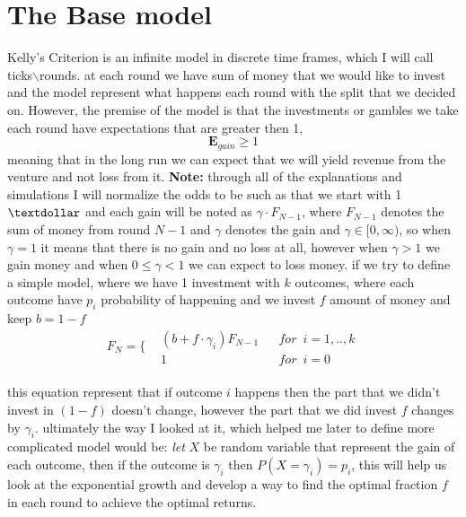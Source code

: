 \documentclass{article}
\begin{document}
	\section{The Base model}
	Kelly's Criterion is an infinite model in discrete time frames, which I will call ticks$\backslash$rounds.
	at each round we have sum of money that we would like to invest and the model represent what happens each round with the split that we decided on.\newline
	However, the premise of the model is that the investments or gambles we take each round have expectations that are greater then 1,
	$$\textbf{E}_{gain} \ge 1$$
	meaning that in the long run we can expect that we will yield revenue from the venture and not loss from it.
	\newline
	\textbf{Note:} through all of the explanations and simulations I will normalize the odds to be such as that we start with 1$\textdollar$ and each gain will be noted as $\gamma\cdot F_{N-1}$, where $F_{N-1}$ denotes the sum of money from round $N-1$ and $\gamma$ denotes the gain and $\gamma\in[0,\infty)$, so when $\gamma = 1$ it means that there is no gain and no loss at all, however when 
	$\gamma > 1$ we gain money and when $ 0\le \gamma < 1$ we can expect to loss money.
	\newline\newline
	if we try to define a simple model, where we have 1 investment with $k$ outcomes, where each outcome have $p_i$ probability of happening and we invest $f$ amount of money and keep $b=1-f$ 
		\begin{equation}
			\label{nes}
			F_N = \Bigg\{
			\begin{aligned}
				&(b + f\cdot \gamma _i)F_{N-1} &&for\enspace i=1,..,k \\
				&1 &&for \enspace i=0
			\end{aligned}
		\end{equation}
	\\
	this equation represent that if outcome $i$ happens then the part that we didn't invest in $(1-f)$ doesn't change, however the part that we did invest $f$ changes by $\gamma_i$.
	\newline
	ultimately the way I looked at it, which helped me later to define more complicated model would be:\newline
	\textit{let} $X$ be random variable that represent the gain of each outcome, then if the outcome is $\gamma_i$ then $P(X=\gamma_i) = p_i$, this will help us look at the exponential growth and develop a way to find the optimal fraction $f$ in each round to achieve the optimal returns.
\end{document}
